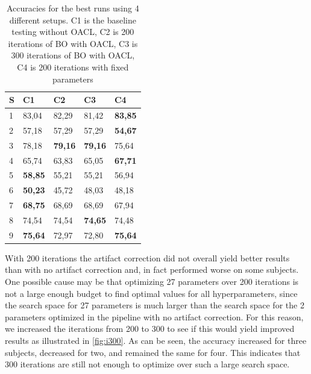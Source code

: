 \begin{table}[H]
	\begin{tabular}{@{}l|llll@{}} \toprule
		S					  & C1             & C2             & C3             & C4             \\ \midrule
		1                     & 83,04          & 82,29          & 81,42          & \textbf{83,85} \\
		2                     & 57,18          & 57,29          & 57,29          & \textbf{54,67} \\
		3                     & 78,18          & \textbf{79,16} & \textbf{79,16} & 75,64          \\
		4                     & 65,74          & 63,83          & 65,05          & \textbf{67,71} \\
		5                     & \textbf{58,85} & 55,21          & 55,21          & 56,94          \\
		6                     & \textbf{50,23} & 45,72          & 48,03          & 48,18          \\
		7                     & \textbf{68,75} & 68,69          & 68,69          & 67,94          \\
		8                     & 74,54          & 74,54          & \textbf{74,65} & 74,48          \\
		9                     & \textbf{75,64} & 72,97          & 72,80          & \textbf{75,64} \\ \bottomrule
	\end{tabular}
	\centering
	\caption{Accuracies for the best runs using 4 different setups. C1 is the baseline testing without OACL, C2 is 200 iterations of BO with OACL, C3 is 300 iterations of BO with OACL, C4 is 200 iterations with fixed parameters}
	\label{my-label}
\end{table}

With 200 iterations the artifact correction did not overall yield better results than with no artifact correction and, in fact performed worse on some subjects. One possible cause may be that optimizing 27 parameters over 200 iterations is not a large enough budget to find optimal values for all hyperparameters, since the search space for 27 parameters is much larger than the search space for the 2 parameters optimized in the pipeline with no artifact correction. For this reason, we increased the iterations from 200 to 300 to see if this would yield improved results as illustrated in \cref{fig:i300}. As can be seen, the accuracy increased for three subjects, decreased for two, and remained the same for four. This indicates that 300 iterations are still not enough to optimize over such a large search space.


